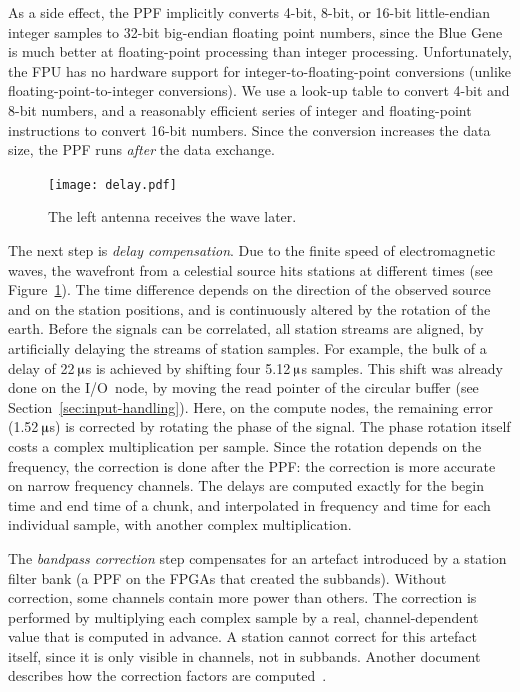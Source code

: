 \documentclass{sig-alternate}
\newcommand{\us}{\,$\muup$s\xspace}
\begin{document}
As a side effect, the PPF implicitly converts 4-bit, 8-bit, or 16-bit
little-endian integer samples to 32-bit big-endian floating point numbers,
since the Blue Gene is much better at floating-point processing than integer
processing.
Unfortunately, the FPU has no hardware support for integer-to-floating-point
conversions (unlike floating-point-to-integer conversions).
We use a look-up table to convert 4-bit and 8-bit numbers, and a reasonably
efficient series of integer and floating-point instructions to convert 16-bit
numbers.
Since the conversion increases the data size, the PPF runs \emph{after\/} the
data exchange.


\begin{figure}[t]
\begin{center}
\texttt{[image: delay.pdf]}
\end{center}
\caption{The left antenna receives the wave later.}
\label{fig:delay}
\end{figure}

The next step is \emph{delay compensation}.
Due to the finite speed of electromagnetic waves, the wavefront from a celestial source hits
stations at different times (see Figure~\ref{fig:delay}).
The time difference depends on the direction of the observed source and on the
station positions, and is continuously altered by the rotation of the earth.
Before the signals can be correlated, all station streams are aligned,
by artificially delaying the streams of station samples.
For example, the bulk of a delay of 22\us is achieved by shifting four 5.12\us
samples.
This shift was already done on the I/O~node, by moving the read pointer
of the circular buffer (see Section~\ref{sec:input-handling}).
Here, on the compute nodes, the remaining error (1.52\us) is corrected by
rotating the phase of the signal.
The phase rotation itself costs a complex multiplication per sample.
Since the rotation depends on the frequency, the correction is done after 
the PPF: the correction is more accurate on narrow frequency channels.
The delays are computed exactly for the begin time and end time of a chunk,
and interpolated in frequency and time for each individual sample, with
another complex multiplication.

The \emph{bandpass correction} step compensates for an artefact
introduced by a station filter bank (a PPF on the FPGAs that created the subbands).
Without correction, some channels contain more power than others.
The correction is performed by multiplying each complex sample by a real,
channel-dependent value that is computed in advance.
A station cannot correct for this artefact itself, since it is only visible
in channels, not in subbands.
Another document describes how the correction factors are
computed~\cite{Romein:08}.
\end{document}
